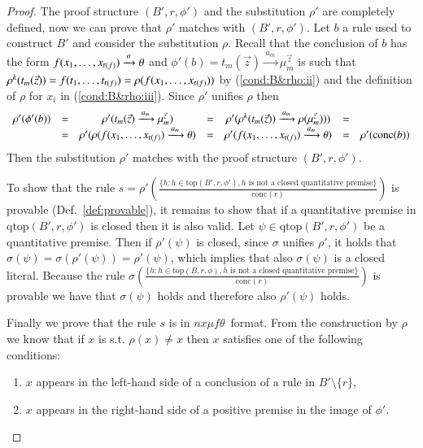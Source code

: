 \documentclass[submission,copyright,creativecommons]{eptcs}
\newcommand{\ddedrule}[2]{\frac{\displaystyle #1}{\displaystyle #2}}
\newcommand{\trans}[1][]{\xrightarrow{\, {#1} \, }}
\newcommand{\rank}{\mathop{\sf r}}
\newcommand{\conc}[1]{\textrm{conc}(#1)}
\newcommand{\nxmuft}{\ensuremath{\textit{nx}\mu\textit{f}\theta}}
\newcommand{\rtop}{\text{top}}
\newcommand{\qtop}{\text{qtop}}
\begin{document}
\begin{proof}
The proof structure  $(B', r, \phi')$ and the substitution $\rho'$ are completely defined,
now we can prove that $\rho'$ matches with $(B', r, \phi')$. 
Let $b$ a rule used to construct $B'$ and consider the substitution $\rho$.
Recall that the conclusion of $b$ has the form
$f(x_1,\ldots,x_{\rank(f)}) \trans[a] \theta$ and
$\phi'(b) = t_m(\vec{z}) \trans[a_m] \mu_{m}^{\vec{z}}$ is such that 
$\rho^k (t_m(\vec{z})) = f(t_1, \dots, t_{\rank(f)}) =\rho(f(x_1, \dots, x_{\rank(f)}))$ 
by (\ref{cond:B&rho:ii}) and the definition of $\rho$ for $x_i$ in 
(\ref{cond:B&rho:iii}). 
Since $\rho'$ unifies $\rho$ then 
\[\begin{array}{rcccccl}
  	\rho'(\phi'(b))
        & = & \rho'( t_m(\vec{z}) \trans[a_m] \mu_{m}^{\vec{z}})
   	& = &\rho'( \rho^k( t_m(\vec{z})) \trans[a_m] \rho(\mu_{m}^{\vec{z}})))
        & = & \\
   	& = &\rho'( \rho(f(x_1, \dots, x_{\rank(f)}) \trans[a_m]  \theta )
   	& = &\rho'( f(x_1, \dots, x_{\rank(f)}) \trans[a_m] \theta)
	& = &\rho'(\conc{b})\\
  \end{array}
\]
Then the substitution $\rho'$ matches with the proof structure $(B', r , \phi')$.

To show that the rule 
$s = \rho' \left(\ddedrule{\{h : h \in \rtop(B', r , \phi'), h \text{ is not a closed quantitative premise}\}}{\conc{r}}\right)$
is provable (Def.~\ref{def:provable}), it remains to show that if a quantitative premise 
in $\qtop(B', r , \phi')$ is closed then it is also valid.
Let $\psi \in \qtop(B', r , \phi')$ be a quantitative premise. 
 Then if  $\rho'(\psi)$ is closed, since $\sigma$ unifies $\rho'$, it holds that
$\sigma(\psi) = \sigma(\rho'(\psi)) = \rho'(\psi)$,
which implies that also $\sigma(\psi)$ is a closed literal. 
 Because the rule 
 $\sigma \left(\ddedrule{\{h : h \in \rtop(B, r , \phi), h \text{ is not a closed quantitative premise}\}}{\conc{r}} \right)$
 is provable we have that $\sigma(\psi)$ holds and therefore also $\rho'(\psi)$ holds.


Finally we prove that the rule $s$ is in \nxmuft\ format. 
From the construction by $\rho$ we know that if $x$ is
s.t. $\rho(x) \neq x$ then $x$ satisfies one of the following conditions:

\begin{enumerate}
 \item $x$ appears in the left-hand side of a conclusion of a rule in $B'\setminus \{r\}$,
 \item $x$ appears in the right-hand side of a positive premise in the image of $\phi'$. 
\end{enumerate}


\end{proof}
\end{document}
